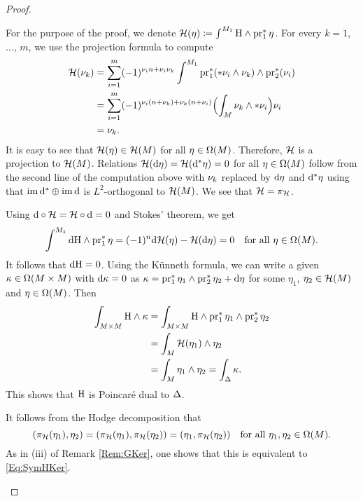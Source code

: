 \documentclass[\MainFolder/Text.tex]{subfiles}
\begin{document}
\begin{proof} %
\begin{ProofList}
\item For the purpose of the proof, we denote $\mathcal{H}(\eta) \coloneqq \int^{M_1} \mathrm{H} \wedge \operatorname{\mathrm{pr}}_1^* \eta$. For every $k=1$,~$\dotsc$, $m$, we use the projection formula to compute
%
\allowdisplaybreaks
\begin{align*}
\mathcal{H}(\nu_k) &= \sum_{i=1}^m (-1)^{\nu_i n+\nu_i \nu_k}\int^{M_1} \operatorname{\mathrm{pr}}_1^*(* \nu_i \wedge \nu_k)\wedge \operatorname{\mathrm{pr}}_2^*(\nu_i) \\ &=\sum_{i=1}^m (-1)^{\nu_i(n+\nu_k) + \nu_k(n+\nu_i)}\Bigl(\int_M \nu_k \wedge * \nu_i\Bigr) \nu_i \\
 & = \nu_k.
\end{align*}
It is easy to see that $\mathcal{H}(\eta) \in \mathcal{H}(M)$ for all $\eta\in \Omega(M)$. Therefore, $\mathcal{H}$ is a projection to $\mathcal{H}(M)$. Relations $\mathcal{H}(\mathrm{d} \eta) = \mathcal{H}(\mathrm{d}^* \eta) = 0$ for all $\eta\in \Omega(M)$ follow from the second line of the computation above with $\nu_k$ replaced by $\mathrm{d}\eta$ and $\mathrm{d}^*\eta$ using that $\operatorname{im} \mathrm{d}^* \oplus \operatorname{im} \mathrm{d}$ is $L^2$-orthogonal to $\mathcal{H}(M)$. We see that $\mathcal{H} = \pi_{\mathcal{H}}$. 

\item Using $\mathrm{d} \circ \mathcal{H} = \mathcal{H} \circ \mathrm{d} = 0$ and Stokes' theorem, we get 
$$  \int^{M_1} \mathrm{d} \mathrm{H} \wedge \operatorname{\mathrm{pr}}_1^* \eta = (-1)^n \mathrm{d} \mathcal{H}(\eta) - \mathcal{H}(\mathrm{d} \eta) = 0\quad \text{for all }\eta\in \Omega(M). $$
It follows that $\mathrm{d} \mathrm{H} = 0$. Using the K\"unneth formula, we can write a given $\kappa\in \Omega(M\times M)$ with $\mathrm{d} \kappa = 0$ as $\kappa = \operatorname{\mathrm{pr}}_1^* \eta_1 \wedge \operatorname{\mathrm{pr}}_2^* \eta_2 + \mathrm{d} \eta$ for some $\eta_1$, $\eta_2 \in \mathcal{H}(M)$ and $\eta\in \Omega(M)$. Then 
$$ \begin{aligned} \int_{M\times M} \mathrm{H} \wedge \kappa & = \int_{M\times M} \mathrm{H} \wedge \operatorname{\mathrm{pr}}_1^* \eta_1 \wedge \operatorname{\mathrm{pr}}_2^* \eta_2 \\ &= \int_M \mathcal{H}(\eta_1)\wedge \eta_2 \\ &= \int_M \eta_1 \wedge \eta_2 = \int_{\Delta} \kappa. \end{aligned} $$
This shows that $\mathrm{H}$ is Poincar\'e dual to $\Delta$.
\item It follows from the Hodge decomposition that
\begin{equation}\label{Eq:HKerHKer}
(\pi_{\mathcal{H}}(\eta_1), \eta_2) = (\pi_{\mathcal{H}}(\eta_1), \pi_{\mathcal{H}}(\eta_2)) = (\eta_1,\pi_{\mathcal{H}}(\eta_2))\quad\text{for all }\eta_1, \eta_2 \in \Omega(M).
\end{equation}
As in (iii) of Remark \ref{Rem:GKer}, one shows that this is equivalent to \eqref{Eq:SymHKer}.\qedhere
\end{ProofList}
\end{proof}
\end{document}
